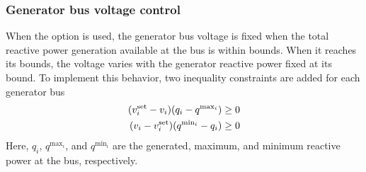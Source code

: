 \subsubsection{Generator bus voltage control}
When the option \opflowoption{\opflowgenbusvoltage~\fixedwithinqbounds} is used, the generator bus voltage is fixed when the total reactive power generation available at the bus is within bounds. When it reaches its bounds, the voltage varies with the generator reactive power fixed at its bound. To implement this behavior, two inequality constraints are added for each generator bus
\begin{equation}
\begin{aligned}
(v^{\text{set}}_i - v_i)(q_i - q^{\text{max}_i}) \ge 0 \\
(v_i - v^{\text{set}}_i)(q^{\text{min}_i} - q_i) \ge 0
\end{aligned}
\label{eq:opflow_genbusvoltage}
\end{equation}
Here, $q_i$, $q^{\text{max}_i}$, and $q^{\text{min}_i}$ are the generated, maximum, and minimum reactive power at the bus, respectively.

